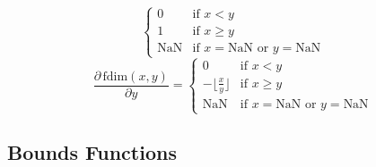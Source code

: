 \begin{description}
{\[\begin{cases}
  0 & \mbox{if } x < y \\
  1 & \mbox{if } x \geq y \\[6pt]
  \textrm{NaN} & \mbox{if } x = \textrm{NaN or } y = \textrm{NaN}
\end{cases}
\]
%
\[
\frac{\partial\,\mbox{fdim}(x,y)}{\partial y} = 
\begin{cases}
  0 & \mbox{if } x < y \\
  -\lfloor\frac{x}{y}\rfloor & \mbox{if } x \geq y \\[6pt]
  \textrm{NaN} & \mbox{if } x = \textrm{NaN or } y = \textrm{NaN}
\end{cases}
\]
%
}
%
\end{description}

\subsection{Bounds Functions}

